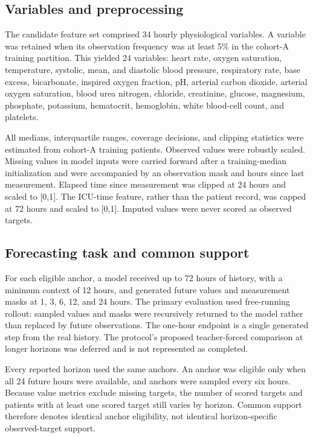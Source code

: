 \documentclass[conference]{IEEEtran}
\begin{document}
\subsection{Variables and preprocessing}\label{variables-and-preprocessing}

The candidate feature set comprised 34 hourly physiological variables. A
variable was retained when its observation frequency was at least 5\% in the
cohort-A training partition. This yielded 24 variables: heart rate, oxygen
saturation, temperature, systolic, mean, and diastolic blood pressure,
respiratory rate, base excess, bicarbonate, inspired oxygen fraction, pH,
arterial carbon dioxide, arterial oxygen saturation, blood urea nitrogen,
chloride, creatinine, glucose, magnesium, phosphate, potassium, hematocrit,
hemoglobin, white blood-cell count, and platelets.

All medians, interquartile ranges, coverage decisions, and clipping statistics
were estimated from cohort-A training patients. Observed values were robustly
scaled. Missing values in model inputs were carried forward after a
training-median initialization and were accompanied by an observation mask and
hours since last measurement. Elapsed time since measurement was clipped at 24
hours and scaled to {[}0,1{]}. The ICU-time feature, rather than the patient
record, was capped at 72 hours and scaled to {[}0,1{]}. Imputed values were never
scored as observed targets.

\subsection{Forecasting task and common support}\label{forecasting-task-and-common-support}

For each eligible anchor, a model received up to 72 hours of history, with a
minimum context of 12 hours, and generated future values and measurement masks
at 1, 3, 6, 12, and 24 hours. The primary evaluation used free-running rollout:
sampled values and masks were recursively returned to the model rather than
replaced by future observations. The one-hour endpoint is a single generated
step from the real history. The protocol's proposed teacher-forced comparison
at longer horizons was deferred and is not represented as completed.

Every reported horizon used the same anchors. An anchor was eligible only when
all 24 future hours were available, and anchors were sampled every six hours.
Because value metrics exclude missing targets, the number of scored targets
and patients with at least one scored target still varies by horizon. Common
support therefore denotes identical anchor eligibility, not identical
horizon-specific observed-target support.
\end{document}

